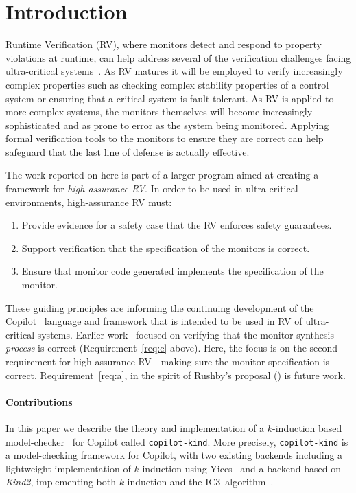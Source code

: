 \section{Introduction}\label{sec:intro}
Runtime Verification (RV), where monitors detect and respond to
property violations at runtime, can help address several of the
verification challenges facing ultra-critical
systems~\cite{pike-rv-11,rvRushby}.  As RV matures it will be employed to
verify increasingly complex properties such as checking complex
stability properties of a control system or ensuring that a critical
system is fault-tolerant. As RV is applied to more complex systems, the
monitors themselves will become increasingly sophisticated and as prone to error
as the system being monitored.  Applying formal verification
tools to the monitors to ensure they are correct can help safeguard
that the last line of defense is actually effective.



 The work reported on here is part of a larger
program aimed at creating a framework for \emph{high assurance RV}. In
order to be used in ultra-critical environments, high-assurance RV
must:
\begin{enumerate}
\item \label{req:a} Provide evidence for a safety case that the RV enforces safety guarantees.
\item \label{req:b} Support verification that the specification of the monitors
  is correct.
\item \label{req:c} Ensure that monitor code generated implements the specification of the
monitor.
\end{enumerate}

\noindent
These guiding principles are informing the continuing development of the
Copilot~\cite{copilot,pike-isse-13} language and framework that is intended to
be used in RV of ultra-critical systems.  Earlier work~\cite{pike-icfp-12}
focused on verifying that the monitor synthesis \emph{process} is correct
(Requirement~\ref{req:c} above). Here, the focus
is on the second requirement for high-assurance RV - making sure the monitor
specification is correct. Requirement~\ref{req:a}, in the spirit of Rushby's
proposal (\cite{rvRushby}) is future work.

\paragraph{Contributions}
In this paper we describe the theory and implementation of a $k$-induction based
model-checker~\cite{Sheeran00,EenS03} for Copilot called
\texttt{copilot-kind}. More precisely, \texttt{copilot-kind} is a model-checking
framework for Copilot, with two existing backends including a lightweight
implementation of $k$-induction using Yices~\cite{Dutertre:cav2014} and a backend based on
\emph{Kind2}, implementing both $k$-induction and the IC3~algorithm~\cite{Somenzi-FMCAD11}.

